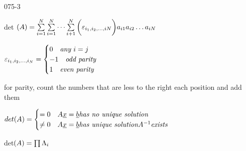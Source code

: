 \begin{mitframe}{075-3}
\begin{listone}
	\item det $(\helmholtz)=\sum\limits_{\state=1}^{\nummoles}\sum\limits_{\state=1}^{\nummoles}\cdots\sum\limits_{\state+1}^{\nummoles}\bigg(\varepsilon_{\state_1, \state_2,\ldots,\state{\nummoles}}\bigg)\activity_{\state{1}}\activity_{\state{2}}\ldots\activity_{\state\nummoles}$
    \begin{listtwo}
    	\item $\varepsilon_{\state_1,\state_2,\ldots,\state_{\nummoles}}=\begin{cases} 0\quad \textit{any   } \state=j\\
        -1\quad \textit{odd parity}\\
         1\quad \textit{even parity}
\end{cases}$
    	\item for parity, count the numbers that are less to the right  each position and add them
    \end{listtwo}
	\item $det (\helmholtz)=\begin{cases}=0\quad\helmholtz\uline{\disp}=\uline{b}\textit{has no unique solution}\\ \neq{0}\quad\helmholtz\uline{\disp}=\uline{b}\textit{has unique solution}\helmholtz^{-1}\textit{exists}\end{cases}$
    \item det$(\helmholtz)=\prod\debroglie_{\state}$
\end{listone}        
\end{mitframe}